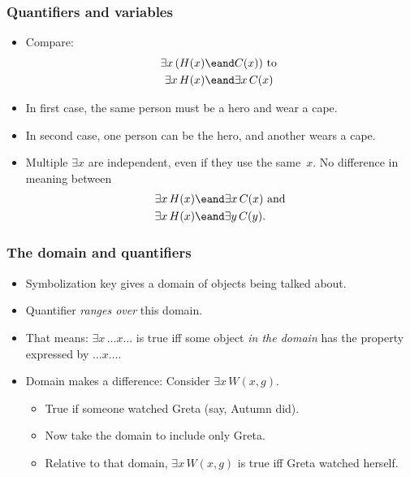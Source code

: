 \begin{frame}
\frametitle{Quantifiers and variables}

  \begin{itemize}[<+->]
    \item Compare:
    \begin{align*}
    \exists x\,(H(x) & \eand C(x)) \text{ to }\\
    \exists x \, H(x) &\eand \exists x\, C(x)
    \end{align*}
    \item In first case, the same person must be a hero and wear a cape.
    \item In second case, one person can be the hero, and another wears a cape.
    \item Multiple $\exists x$ are independent, even if they use
    the same~$x$. No difference in meaning between
    \begin{align*}
     & \exists x \, H(x) \eand \exists x\, C(x) \text{ and}\\
     & \exists x \, H(x) \eand \exists y\, C(y).
    \end{align*}
  \end{itemize}
\end{frame}

\begin{frame}
\frametitle{The domain and quantifiers}

\begin{itemize}[<+->]
  \item Symbolization key gives a domain of objects being talked about.
  \item Quantifier \emph{ranges over} this domain.
  \item That means: $\exists x\, \dots x \dots$ is true iff some object
  \emph{in the domain} has the property expressed by $\dots x \dots$.
  \item Domain makes a difference: Consider $\exists x\, W(x, g)$.
  \begin{itemize}
    \item True if someone watched Greta (say, Autumn did).
    \item Now take the domain to include only Greta.
    \item Relative to that domain, $\exists x\, W(x,g)$ is true iff
    Greta watched herself.
  \end{itemize}
\end{itemize}
\end{frame}

